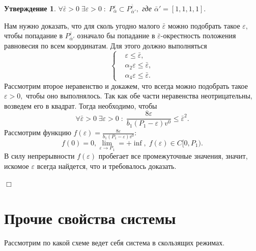 \documentclass[11pt]{article}
\newtheorem{statement}{Утверждение}
\theoremstyle{definition}
\newenvironment{Proof}
{\par\noindent{\bf Доказательство.\\}} 
{\begin{flushright}$\Box$\end{flushright}}
\begin{document}
\begin{statement}
	$\forall \bar \varepsilon > 0 \; \exists \varepsilon > 0 \;:\;  P^{\varepsilon}_{\bar \alpha} \subset P^{\bar \varepsilon}_{\bar\alpha'} ,$ где
	$\bar \alpha' = [1,1,1,1].$
\end{statement}
\begin{Proof}
	Нам нужно доказать, что для сколь угодно малого $\bar \varepsilon$ можно подобрать такое $\varepsilon,$ чтобы попадание в $P^{\bar \varepsilon}_{\bar\alpha'}$ означало бы попадание в $\bar \varepsilon$-окрестность положения равновесия по всем координатам. Для этого должно выполняться
	$$
		\left\{
		\begin{aligned}
			&\varepsilon \leqslant \bar \varepsilon, \\
			&\alpha_2\varepsilon \leqslant \bar\varepsilon, \\
			&\alpha_4\varepsilon \leqslant \bar\varepsilon.
		\end{aligned}
		\right.
	$$
	Рассмотрим второе неравенство и докажем, что всегда можно подобрать такое $\varepsilon > 0,$ чтобы оно выполнялось. Так как обе части неравенства неотрицательны, возведем его в квадрат. Тогда необходимо, чтобы
	$$\forall \bar \varepsilon > 0 \; \exists \varepsilon > 0 \;:\; \frac{8\varepsilon}{b_1(P_1 - \varepsilon)v^0} \leqslant \bar \varepsilon^2.$$
	Рассмотрим функцию $f(\varepsilon) = \frac{8\varepsilon}{b_1(P_1 - \varepsilon)v^0}:$ 
	$$f(0) = 0, \lim_{\varepsilon \to P_1} = +\inf, \; f(\varepsilon) \in C[0,P_1).$$
	В силу непрерывности $f(\varepsilon)$ пробегает все промежуточные значения, значит, искомое $\varepsilon$ всегда найдется, что и требовалось доказать.
\end{Proof}


\section{Прочие свойства системы}

Рассмотрим по какой схеме ведет себя система в скользящих режимах. \\
\end{document}
